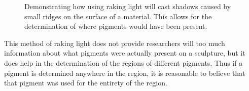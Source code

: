 \documentclass[10pt]{armath}
\begin{document}
\begin{figure}[htpb]
\begin{center}
\end{center}
\caption{Demonstrating how using raking light will cast shadows caused by small
ridges on the surface of a material. This allows for the determination of where
pigments would have been present.}
\label{fig:raking_light_2}
\end{figure}

This method of raking light does not provide researchers will too much
information about what pigments were actually present on a sculpture, but it
does help in the determination of the regions of different pigments. Thus if a
pigment is determined anywhere in the region, it is reasonable to  believe
that that pigment was used for the entirety of the region.
\end{document}
